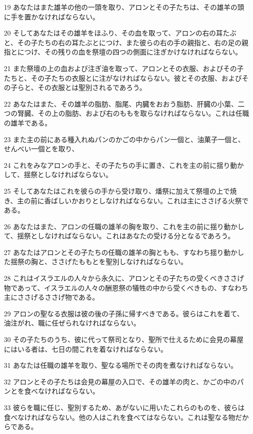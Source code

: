 \par 19 あなたはまた雄羊の他の一頭を取り、アロンとその子たちは、その雄羊の頭に手を置かなければならない。
\par 20 そしてあなたはその雄羊をほふり、その血を取って、アロンの右の耳たぶと、その子たちの右の耳たぶとにつけ、また彼らの右の手の親指と、右の足の親指とにつけ、その残りの血を祭壇の四つの側面に注ぎかけなければならない。
\par 21 また祭壇の上の血および注ぎ油を取って、アロンとその衣服、およびその子たちと、その子たちの衣服とに注がなければならない。彼とその衣服、およびその子らと、その衣服とは聖別されるであろう。
\par 22 あなたはまた、その雄羊の脂肪、脂尾、内臓をおおう脂肪、肝臓の小葉、二つの腎臓、その上の脂肪、および右のももを取らなければならない。これは任職の雄羊である。
\par 23 また主の前にある種入れぬパンのかごの中からパン一個と、油菓子一個と、せんべい一個とを取り、
\par 24 これをみなアロンの手と、その子たちの手に置き、これを主の前に揺り動かして、揺祭としなければならない。
\par 25 そしてあなたはこれを彼らの手から受け取り、燔祭に加えて祭壇の上で焼き、主の前に香ばしいかおりとしなければならない。これは主にささげる火祭である。
\par 26 あなたはまた、アロンの任職の雄羊の胸を取り、これを主の前に揺り動かして、揺祭としなければならない。これはあなたの受ける分となるであろう。
\par 27 あなたはアロンとその子たちの任職の雄羊の胸ともも、すなわち揺り動かした揺祭の胸と、ささげたももとを聖別しなければならない。
\par 28 これはイスラエルの人々から永久に、アロンとその子たちの受くべきささげ物であって、イスラエルの人々の酬恩祭の犠牲の中から受くべきもの、すなわち主にささげるささげ物である。
\par 29 アロンの聖なる衣服は彼の後の子孫に帰すべきである。彼らはこれを着て、油注がれ、職に任ぜられなければならない。
\par 30 その子たちのうち、彼に代って祭司となり、聖所で仕えるために会見の幕屋にはいる者は、七日の間これを着なければならない。
\par 31 あなたは任職の雄羊を取り、聖なる場所でその肉を煮なければならない。
\par 32 アロンとその子たちは会見の幕屋の入口で、その雄羊の肉と、かごの中のパンとを食べなければならない。
\par 33 彼らを職に任じ、聖別するため、あがないに用いたこれらのものを、彼らは食べなければならない。他の人はこれを食べてはならない。これは聖なる物だからである。
